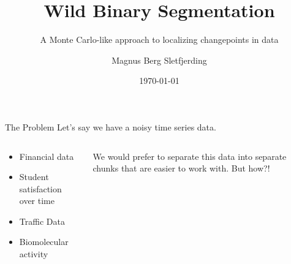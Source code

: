 \documentclass[10pt]{beamer}
\title{Wild Binary Segmentation}
\subtitle{A Monte Carlo-like approach to localizing changepoints in data}
\date{\today}
\author{Magnus Berg Sletfjerding}
\begin{document}
\maketitle


\begin{frame}[t]{The Problem}
  Let's say we have a noisy time series data.

  \begin{columns}
  \begin{column}[T]{0.48\textwidth}
    \begin{itemize}
      \item Financial data
      \item Student satisfaction over time
      \item Traffic Data
      \item Biomolecular activity
    \end{itemize}
  \end{column}
  \hfill
  \begin{column}[T]{0.48\textwidth}
  We would prefer to separate this data into separate chunks that are easier to work with.
  But how?!
  \end{column}
  \end{columns}


  \begin{figure}

  \end{figure}

\end{frame}
\end{document}
